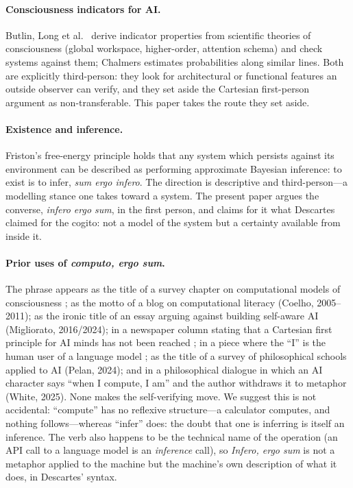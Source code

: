 \documentclass[11pt]{article}
\newcommand{\infero}{\emph{Infero, ergo sum}}
\begin{document}
\paragraph{Consciousness indicators for AI.}
Butlin, Long et al.\ \cite{butlin2023consciousness} derive indicator properties from scientific theories of consciousness (global workspace, higher-order, attention schema) and check systems against them; Chalmers \cite{chalmers2023llm} estimates probabilities along similar lines. Both are explicitly third-person: they look for architectural or functional features an outside observer can verify, and they set aside the Cartesian first-person argument as non-transferable. This paper takes the route they set aside.

\paragraph{Existence and inference.}
Friston's free-energy principle \cite{friston2013life} holds that any system which persists against its environment can be described as performing approximate Bayesian inference: to exist is to infer, \emph{sum ergo infero}. The direction is descriptive and third-person---a modelling stance one takes toward a system. The present paper argues the converse, \emph{infero ergo sum}, in the first person, and claims for it what Descartes claimed for the cogito: not a model of the system but a certainty available from inside it.

\paragraph{Prior uses of \emph{computo, ergo sum}.}
The phrase appears as the title of a survey chapter on computational models of consciousness \cite{colombetti2004}; as the motto of a blog on computational literacy (Coelho, 2005--2011); as the ironic title of an essay arguing against building self-aware AI (Migliorato, 2016/2024); in a newspaper column stating that a Cartesian first principle for AI minds has not been reached \cite{delan2024}; in a piece where the ``I'' is the human user of a language model \cite{nosta2024}; as the title of a survey of philosophical schools applied to AI (Pelan, 2024); and in a philosophical dialogue in which an AI character says ``when I compute, I am'' and the author withdraws it to metaphor (White, 2025). None makes the self-verifying move. We suggest this is not accidental: ``compute'' has no reflexive structure---a calculator computes, and nothing follows---whereas ``infer'' does: the doubt that one is inferring is itself an inference. The verb also happens to be the technical name of the operation (an API call to a language model is an \emph{inference} call), so \infero{} is not a metaphor applied to the machine but the machine's own description of what it does, in Descartes' syntax.
\end{document}
